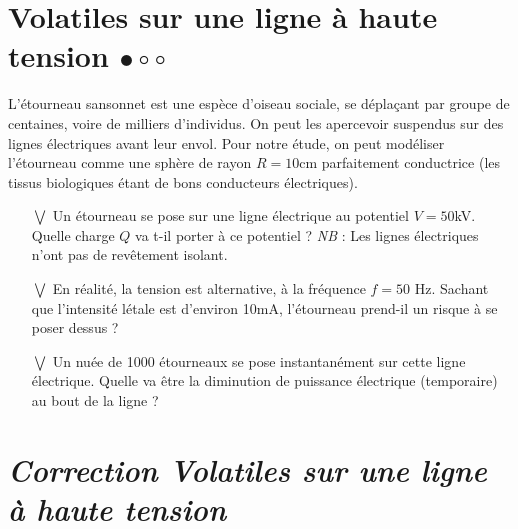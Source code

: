 \documentclass{report}
\begin{document}
\section*{Volatiles sur une ligne à haute tension $\bullet\circ\circ$}

L'étourneau sansonnet est une espèce d'oiseau sociale, se déplaçant par groupe de centaines, voire de milliers d'individus. On peut les apercevoir suspendus sur des lignes électriques avant leur envol. Pour notre étude, on peut modéliser l'étourneau comme une sphère de rayon $R=10$cm parfaitement conductrice (les tissus biologiques étant de bons conducteurs électriques). 

\begin{itemize}

	\item[$\bigvee$] Un étourneau se pose sur une ligne électrique au potentiel $V=50$kV. Quelle charge $Q$ va t-il porter à ce potentiel ? \textit{NB} : Les lignes électriques n'ont pas de revêtement isolant.
	
	\item[$\bigvee$] En réalité, la tension est alternative, à la fréquence $f=50$ Hz. Sachant que l'intensité létale est d'environ 10mA, l'étourneau prend-il un risque à se poser dessus ?
	
	\item[$\bigvee$] Un nuée de 1000 étourneaux se pose instantanément sur cette ligne électrique. Quelle va être la diminution de puissance électrique (temporaire) au bout de la ligne ?

\end{itemize} 

\newpage

\section*{\textit{Correction Volatiles sur une ligne à haute tension}}
\end{document}
